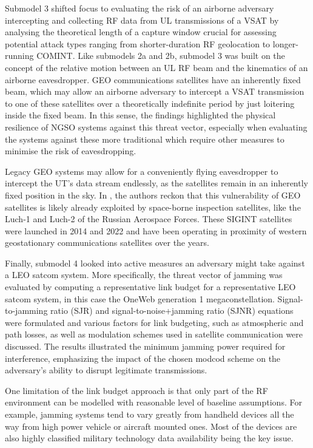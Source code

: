 \documentclass[english, 12pt, a4paper, elec, utf8, a-1b, online]{aaltothesis}
\begin{document}
Submodel 3 shifted focus to evaluating the risk of an airborne adversary intercepting and collecting RF data from UL transmissions of a VSAT by analysing the theoretical length of a capture window crucial for assessing potential attack types ranging from shorter-duration RF geolocation to longer-running COMINT.
Like submodels 2a and 2b, submodel 3 was built on the concept of the relative motion between an UL RF beam and the kinematics of an airborne eavesdropper. GEO communications satellites have an inherently fixed beam, which may allow an airborne adversary to intercept a VSAT transmission to one of these satellites over a theoretically indefinite period by just loitering inside the fixed beam.
In this sense, the findings highlighted the physical resilience of NGSO systems against this threat vector, especially when evaluating the systems against these more traditional which require other measures to minimise the risk of eavesdropping. %

Legacy GEO systems may allow for a conveniently flying eavesdropper to intercept the UT's data stream endlessly, as the satellites remain in an inherently fixed position in the sky.
In \cite{bingen2023space}, the authors reckon that this vulnerability of GEO satellites is likely already exploited by space-borne inspection satellites, like the Luch-1 and Luch-2 of the Russian Aerospace Forces.
These SIGINT satellites were launched in 2014 and 2022 and have been operating in proximity of western geostationary communications satellites over the years.

Finally, submodel 4 looked into active measures an adversary might take against a LEO satcom system. More specifically, the threat vector of jamming was evaluated by computing a representative link budget for a representative LEO satcom system, in this case the OneWeb generation 1 megaconstellation.
Signal-to-jamming ratio (SJR) and signal-to-noise+jamming ratio (SJNR) equations were formulated and various factors for link budgeting, such as atmospheric and path losses, as well as modulation schemes used in satellite communication were discussed.
The results illustrated the minimum jamming power required for interference, emphasizing the impact of the chosen modcod scheme on the adversary's ability to disrupt legitimate transmissions. 

One limitation of the link budget approach is that only part of the RF environment can be modelled with reasonable level of baseline assumptions. For example, jamming systems tend to vary greatly from handheld devices all the way from high power vehicle or aircraft mounted ones. Most of the devices are also highly classified military technology data availability being the key issue.
\end{document}
